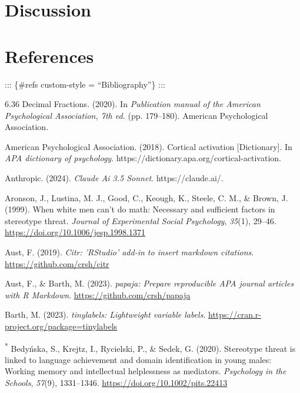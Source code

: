 \documentclass[
  stu,floatsintext]{apa7}
\newlength{\cslhangindent}
\newenvironment{CSLReferences}[2] %
 {\begin{list}{}{%
  \setlength{\itemindent}{0pt}
  \setlength{\leftmargin}{0pt}
  \setlength{\parsep}{0pt}
  \ifodd #1
   \setlength{\leftmargin}{\cslhangindent}
   \setlength{\itemindent}{-1\cslhangindent}
  \fi
  \setlength{\itemsep}{#2\baselineskip}}}
 {\end{list}}
\begin{document}
\section{Discussion}\label{discussion}

\newpage

\section{References}\label{references}

::: \{\#refs custom-style = ``Bibliography''\}
:::

\label{refs}
\begin{CSLReferences}{1}{0}
6.36 {Decimal Fractions}. (2020). In \emph{Publication manual of the {American Psychological Association}, 7th ed.} (pp. 179--180). American Psychological Association.

American Psychological Association. (2018). Cortical activation {[}Dictionary{]}. In \emph{APA dictionary of psychology}. https://dictionary.apa.org/cortical-activation.

Anthropic. (2024). \emph{Claude {Ai} 3.5 {Sonnet}}. https://claude.ai/.

Aronson, J., Lustina, M. J., Good, C., Keough, K., Steele, C. M., \& Brown, J. (1999). When white men can't do math: {Necessary} and sufficient factors in stereotype threat. \emph{Journal of Experimental Social Psychology}, \emph{35}(1), 29--46. \url{https://doi.org/10.1006/jesp.1998.1371}

Aust, F. (2019). \emph{Citr: 'RStudio' add-in to insert markdown citations}. \url{https://github.com/crsh/citr}

Aust, F., \& Barth, M. (2023). \emph{{papaja}: {Prepare} reproducible {APA} journal articles with {R Markdown}}. \url{https://github.com/crsh/papaja}

Barth, M. (2023). \emph{{tinylabels}: Lightweight variable labels}. \url{https://cran.r-project.org/package=tinylabels}

\textsuperscript{*} Bedyńska, S., Krejtz, I., Rycielski, P., \& Sedek, G. (2020). Stereotype threat is linked to language achievement and domain identification in young males: {Working} memory and intellectual helplessness as mediators. \emph{Psychology in the Schools}, \emph{57}(9), 1331--1346. \url{https://doi.org/10.1002/pits.22413}


\end{CSLReferences}
\end{document}

